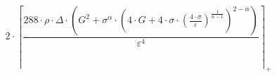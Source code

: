 \[2 \cdot \left\lceil \frac{288 \cdot \rho \cdot \Delta \cdot \left(G^{2} + \sigma^{\alpha} \cdot \left(4 \cdot G + 4 \cdot \sigma \cdot \left(\frac{4 \cdot \sigma}{\varepsilon}\right)^{\frac{1}{\alpha - 1}}\right)^{2 - \alpha}\right)}{\varepsilon^{4}} \right\rceil_{+}\]
